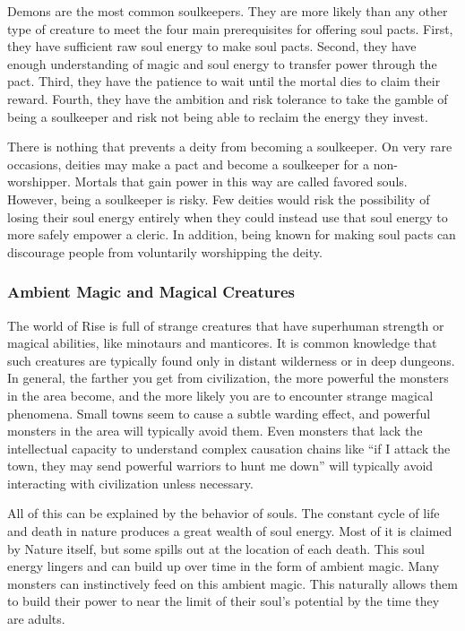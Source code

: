             Demons are the most common soulkeepers.
            They are more likely than any other type of creature to meet the four main prerequisites for offering soul pacts.
            First, they have sufficient raw soul energy to make soul pacts.
            Second, they have enough understanding of magic and soul energy to transfer power through the pact.
            Third, they have the patience to wait until the mortal dies to claim their reward.
            Fourth, they have the ambition and risk tolerance to take the gamble of being a soulkeeper and risk not being able to reclaim the energy they invest.

            There is nothing that prevents a deity from becoming a soulkeeper.
            On very rare occasions, deities may make a pact and become a soulkeeper for a non-worshipper.
            Mortals that gain power in this way are called favored souls.
            However, being a soulkeeper is risky.
            Few deities would risk the possibility of losing their soul energy entirely when they could instead use that soul energy to more safely empower a cleric.
            In addition, being known for making soul pacts can discourage people from voluntarily worshipping the deity.

        \subsubsection{Ambient Magic and Magical Creatures}
            The world of Rise is full of strange creatures that have superhuman strength or magical abilities, like minotaurs and manticores.
            It is common knowledge that such creatures are typically found only in distant wilderness or in deep dungeons.
            In general, the farther you get from civilization, the more powerful the monsters in the area become, and the more likely you are to encounter strange magical phenomena.
            Small towns seem to cause a subtle warding effect, and powerful monsters in the area will typically avoid them.
            Even monsters that lack the intellectual capacity to understand complex causation chains like ``if I attack the town, they may send powerful warriors to hunt me down'' will typically avoid interacting with civilization unless necessary.

            All of this can be explained by the behavior of souls.
            The constant cycle of life and death in nature produces a great wealth of soul energy.
            Most of it is claimed by Nature itself, but some spills out at the location of each death.
            This soul energy lingers and can build up over time in the form of ambient magic.
            Many monsters can instinctively feed on this ambient magic.
            This naturally allows them to build their power to near the limit of their soul's potential by the time they are adults.

